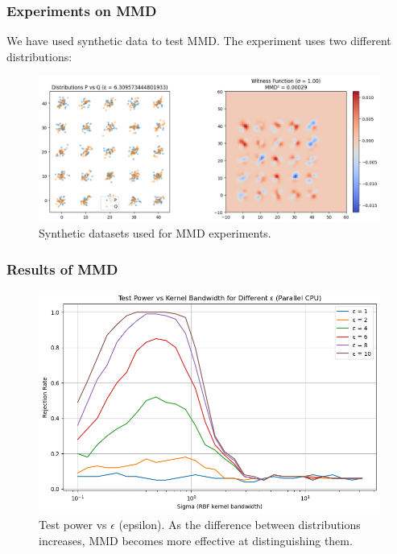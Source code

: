 \documentclass{beamer}
\begin{document}
\begin{frame}
    \frametitle{Experiments on MMD}
    We have used synthetic data to test MMD. The experiment uses two different distributions:
    \begin{figure}[h]
        \centering
        \includegraphics[width=0.9\linewidth]{mmdDataset.png}
        \caption{Synthetic datasets used for MMD experiments.}
    \end{figure}
\end{frame}

\begin{frame}
    \frametitle{Results of MMD}
    \begin{figure}[h]
        \centering
        \includegraphics[width=0.8\linewidth]{Test_powe_vs_eps.png}
        \caption{Test power vs $\epsilon$ (epsilon). As the difference between distributions increases, MMD becomes more effective at distinguishing them.}
    \end{figure}
\end{frame}
\end{document}
